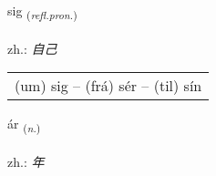 \documentclass[frontgrid, backgrid]{flacards}\usepackage[]{graphicx}\usepackage[]{xcolor}
\begin{document}
\renewcommand{\blhead}{\vskip5pt {\small\bfseries\footnotesize Fornafn | 代词 }}
\renewcommand{\bcfoot}{\vskip5pt \hspace{2pt}{\small\bfseries\footnotesize 1K}}


{sig \small{\textsubscript{(\textit{refl.pron.})}} \\[1ex] %
\textphonetic{[sɪːɣ]} \\
zh.: \emph{自己} \\  [2ex]
\renewcommand*{\arraystretch}{0.8}
\begin{tabular}{l}
(um) sig -- (frá) sér -- (til) sín \\ 
\end{tabular}
}

\renewcommand{\flhead}{\vskip5pt \fboxsep=0pt {\small\bfseries\footnotesize Nafnorð | 名词}}
\renewcommand{\fcfoot}{\vskip5pt \fboxsep=0pt \hspace{2pt}{\small\bfseries\footnotesize 1K}}

\renewcommand{\blhead}{\vskip5pt {\small\bfseries\footnotesize Nafnorð | 名词 }}
\renewcommand{\bcfoot}{\vskip5pt \hspace{2pt}{\small\bfseries\footnotesize 1K}}


{ár \small{\textsubscript{(\textit{n.})}} \\[1ex] %
\textphonetic{[auːr]} \\
zh.: \emph{年} \\  [2ex]
\renewcommand*{\arraystretch}{0.8}
}

\renewcommand{\flhead}{\vskip5pt \fboxsep=0pt {\small\bfseries\footnotesize Fornafn | 代词}}
\renewcommand{\fcfoot}{\vskip5pt \fboxsep=0pt \hspace{2pt}{\small\bfseries\footnotesize 1K}}
\end{document}
